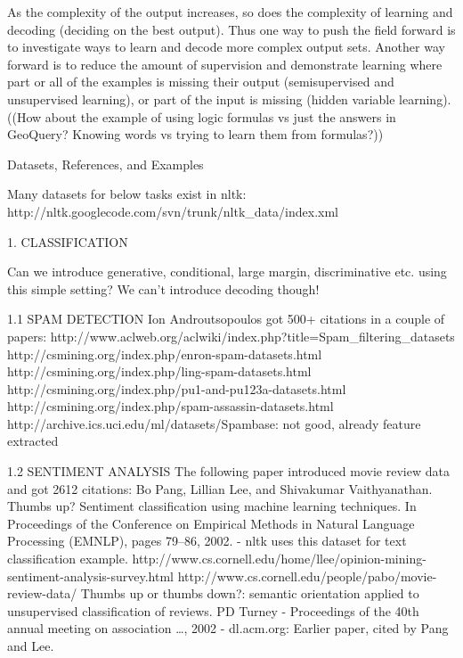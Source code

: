 \documentclass[ignorenonframetext]{beamer}
\begin{document}
As the complexity of the output increases, so does the complexity of
learning and decoding (deciding on the best output).  Thus one way to
push the field forward is to investigate ways to learn and decode more
complex output sets.  Another way forward is to reduce the amount of
supervision and demonstrate learning where part or all of the examples
is missing their output (semisupervised and unsupervised learning), or
part of the input is missing (hidden variable learning).  ((How about
the example of using logic formulas vs just the answers in GeoQuery?
Knowing words vs trying to learn them from formulas?))


Datasets, References, and Examples

Many datasets for below tasks exist in nltk:
http://nltk.googlecode.com/svn/trunk/nltk_data/index.xml

1. CLASSIFICATION

Can we introduce generative, conditional, large margin, discriminative
etc. using this simple setting?  We can't introduce decoding though!

1.1 SPAM DETECTION
Ion Androutsopoulos got 500+ citations in a couple of papers:
http://www.aclweb.org/aclwiki/index.php?title=Spam_filtering_datasets
http://csmining.org/index.php/enron-spam-datasets.html
http://csmining.org/index.php/ling-spam-datasets.html
http://csmining.org/index.php/pu1-and-pu123a-datasets.html
http://csmining.org/index.php/spam-assassin-datasets.html
http://archive.ics.uci.edu/ml/datasets/Spambase: not good, already feature extracted

1.2 SENTIMENT ANALYSIS
The following paper introduced movie review data and got 2612 citations:
Bo Pang, Lillian Lee, and Shivakumar Vaithyanathan. Thumbs up? Sentiment classiﬁcation using
machine learning techniques. In Proceedings of the Conference on Empirical Methods in Natural
Language Processing (EMNLP), pages 79–86, 2002.
- nltk uses this dataset for text classification example.
http://www.cs.cornell.edu/home/llee/opinion-mining-sentiment-analysis-survey.html
http://www.cs.cornell.edu/people/pabo/movie-review-data/
Thumbs up or thumbs down?: semantic orientation applied to unsupervised classification of reviews. PD Turney - Proceedings of the 40th annual meeting on association …, 2002 - dl.acm.org: Earlier paper, cited by Pang and Lee.
\end{document}
